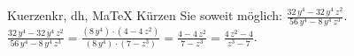 \begin{MAufgabe}{Kuerzen}{kr, dh, MaTeX}
K\"urzen Sie soweit m\"oglich: $\frac{32\, y^4 - 32\, y^4\, z^2}{56\, y^4 - 8\, y^4\, z^3}$.\\ 
\ifLsg\MLoesung
\quad $\frac{32\, y^4 - 32\, y^4\, z^2}{56\, y^4 - 8\, y^4\, z^3}=\frac{(8\, y^4)\cdot(4 - 4\, z^2)}{(8\, y^4)\cdot(7 - z^3)}=\frac{4 - 4\, z^2}{7 - z^3}=\frac{4\, z^2 - 4}{z^3 - 7}$.\else\relax\fi
 \end{MAufgabe}